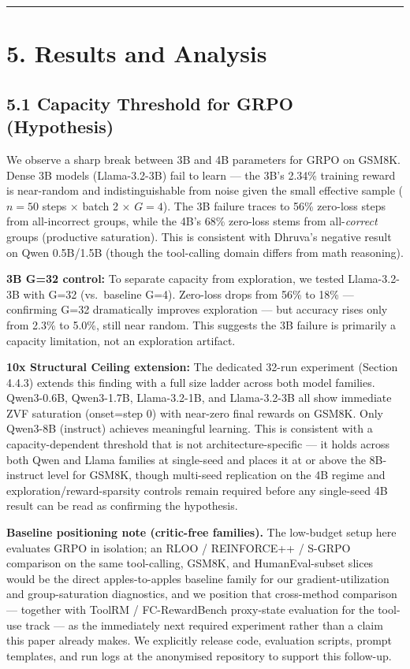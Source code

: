 \documentclass[
  american,
  11pt,
  a4paper,
  oneside]{report}
\begin{document}
\begin{center}\rule{0.5\linewidth}{0.5pt}\end{center}

\chapter{5. Results and Analysis}\label{results-and-analysis}

\section{5.1 Capacity Threshold for GRPO
(Hypothesis)}\label{capacity-threshold-for-grpo-hypothesis}

We observe a sharp break between 3B and 4B parameters for GRPO on GSM8K.
Dense 3B models (Llama-3.2-3B) fail to learn --- the 3B's 2.34\%
training reward is near-random and indistinguishable from noise given
the small effective sample (\(n{=}50\) steps × batch 2 × \(G{=}4\)). The
3B failure traces to 56\% zero-loss steps from all-incorrect groups,
while the 4B's 68\% zero-loss stems from all-\emph{correct} groups
(productive saturation). This is consistent with Dhruva's negative
result on Qwen 0.5B/1.5B (though the tool-calling domain differs from
math reasoning).

\textbf{3B G=32 control:} To separate capacity from exploration, we
tested Llama-3.2-3B with G=32 (vs.~baseline G=4). Zero-loss drops from
56\% to 18\% --- confirming G=32 dramatically improves exploration ---
but accuracy rises only from 2.3\% to 5.0\%, still near random. This
suggests the 3B failure is primarily a capacity limitation, not an
exploration artifact.

\textbf{10x Structural Ceiling extension:} The dedicated 32-run
experiment (Section 4.4.3) extends this finding with a full size ladder
across both model families. Qwen3-0.6B, Qwen3-1.7B, Llama-3.2-1B, and
Llama-3.2-3B all show immediate ZVF saturation (onset=step 0) with
near-zero final rewards on GSM8K. Only Qwen3-8B (instruct) achieves
meaningful learning. This is consistent with a capacity-dependent
threshold that is not architecture-specific --- it holds across both
Qwen and Llama families at single-seed and places it at or above the
8B-instruct level for GSM8K, though multi-seed replication on the 4B
regime and exploration/reward-sparsity controls remain required before
any single-seed 4B result can be read as confirming the hypothesis.

\textbf{Baseline positioning note (critic-free families).} The
low-budget setup here evaluates GRPO in isolation; an RLOO / REINFORCE++
/ S-GRPO comparison on the same tool-calling, GSM8K, and
HumanEval-subset slices would be the direct apples-to-apples baseline
family for our gradient-utilization and group-saturation diagnostics,
and we position that cross-method comparison --- together with ToolRM /
FC-RewardBench proxy-state evaluation for the tool-use track --- as the
immediately next required experiment rather than a claim this paper
already makes. We explicitly release code, evaluation scripts, prompt
templates, and run logs at the anonymised repository to support this
follow-up.
\end{document}
